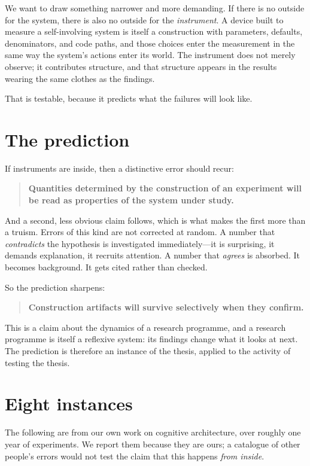 \documentclass[11pt]{article}
\begin{document}
We want to draw something narrower and more demanding. If there is no outside
for the system, there is also no outside for the \emph{instrument}. A device
built to measure a self-involving system is itself a construction with
parameters, defaults, denominators, and code paths, and those choices enter the
measurement in the same way the system's actions enter its world. The
instrument does not merely observe; it contributes structure, and that
structure appears in the results wearing the same clothes as the findings.

That is testable, because it predicts what the failures will look like.

\section{The prediction}

If instruments are inside, then a distinctive error should recur:

\begin{quote}
\textbf{Quantities determined by the construction of an experiment will be read
as properties of the system under study.}
\end{quote}

And a second, less obvious claim follows, which is what makes the first more
than a truism. Errors of this kind are not corrected at random. A number that
\emph{contradicts} the hypothesis is investigated immediately---it is
surprising, it demands explanation, it recruits attention. A number that
\emph{agrees} is absorbed. It becomes background. It gets cited rather than
checked.

So the prediction sharpens:

\begin{quote}
\textbf{Construction artifacts will survive selectively when they confirm.}
\end{quote}

This is a claim about the dynamics of a research programme, and a research
programme is itself a reflexive system: its findings change what it looks at
next. The prediction is therefore an instance of the thesis, applied to the
activity of testing the thesis.

\section{Eight instances}

The following are from our own work on cognitive architecture, over roughly one
year of experiments. We report them because they are ours; a catalogue of other
people's errors would not test the claim that this happens \emph{from inside}.
\end{document}
